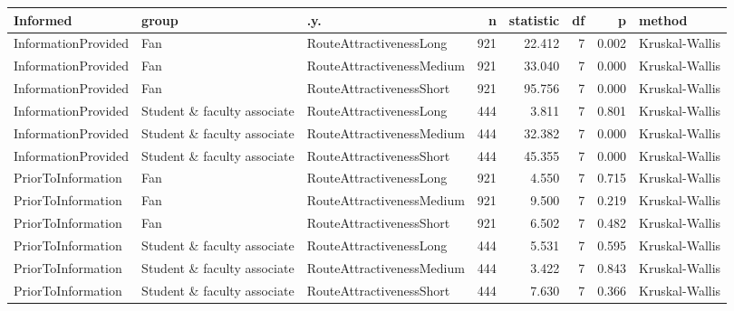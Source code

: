 \begin{tabular}{lllrrrrl}
  \hline
Informed & group & .y. & n & statistic & df & p & method \\ 
  \hline
InformationProvided & Fan & RouteAttractivenessLong &  921 & 22.412 &    7 & 0.002 & Kruskal-Wallis \\ 
  InformationProvided & Fan & RouteAttractivenessMedium &  921 & 33.040 &    7 & 0.000 & Kruskal-Wallis \\ 
  InformationProvided & Fan & RouteAttractivenessShort &  921 & 95.756 &    7 & 0.000 & Kruskal-Wallis \\ 
  InformationProvided & Student \& faculty associate & RouteAttractivenessLong &  444 & 3.811 &    7 & 0.801 & Kruskal-Wallis \\ 
  InformationProvided & Student \& faculty associate & RouteAttractivenessMedium &  444 & 32.382 &    7 & 0.000 & Kruskal-Wallis \\ 
  InformationProvided & Student \& faculty associate & RouteAttractivenessShort &  444 & 45.355 &    7 & 0.000 & Kruskal-Wallis \\ 
  PriorToInformation & Fan & RouteAttractivenessLong &  921 & 4.550 &    7 & 0.715 & Kruskal-Wallis \\ 
  PriorToInformation & Fan & RouteAttractivenessMedium &  921 & 9.500 &    7 & 0.219 & Kruskal-Wallis \\ 
  PriorToInformation & Fan & RouteAttractivenessShort &  921 & 6.502 &    7 & 0.482 & Kruskal-Wallis \\ 
  PriorToInformation & Student \& faculty associate & RouteAttractivenessLong &  444 & 5.531 &    7 & 0.595 & Kruskal-Wallis \\ 
  PriorToInformation & Student \& faculty associate & RouteAttractivenessMedium &  444 & 3.422 &    7 & 0.843 & Kruskal-Wallis \\ 
  PriorToInformation & Student \& faculty associate & RouteAttractivenessShort &  444 & 7.630 &    7 & 0.366 & Kruskal-Wallis \\ 
   \hline
\end{tabular}
